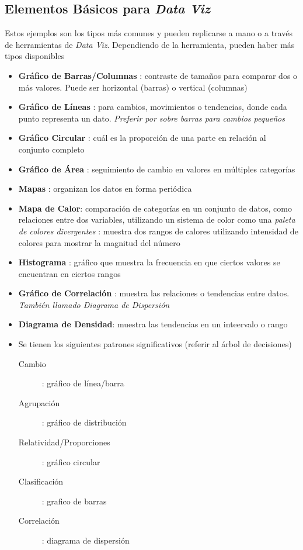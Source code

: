 \subsection{Elementos Básicos para \textit{Data Viz}}
Estos ejemplos son los tipos más comunes y pueden replicarse a mano o a través de herramientas de \textit{Data Viz}. Dependiendo de la herramienta, pueden haber más tipos disponibles
\begin{itemize}
    \item {\textbf{Gráfico de Barras/Columnas} : contraste de tamaños para comparar dos o más valores. Puede ser horizontal (barras) o vertical (columnas)}
    \item {\textbf{Gráfico de Líneas} : para cambios, movimientos o tendencias, donde cada punto representa un dato. \textit{Preferir por sobre barras para cambios pequeños}}
    \item {\textbf{Gráfico Circular} : cuál es la proporción de una parte en relación al conjunto completo}
    \item {\textbf{Gráfico de Área} : seguimiento de cambio en valores en múltiples categorías}
    \item {\textbf{Mapas} : organizan los datos en forma periódica}
    \item {\textbf{Mapa de Calor}: comparación de categorías en un conjunto de datos, como relaciones entre dos variables, utilizando un sistema de color como una \textit{paleta de colores divergentes} : muestra dos rangos de calores utilizando intensidad de colores para mostrar la magnitud del número}
    \item {\textbf{Histograma} : gráfico que muestra la frecuencia en que ciertos valores se encuentran en ciertos rangos}
    \item {\textbf{Gráfico de Correlación} : muestra las relaciones o tendencias entre datos. \textit{También llamado Diagrama de Dispersión}}
    \item {\textbf{Diagrama de Densidad}: muestra las tendencias en un inteervalo o rango}
    \item {Se tienen los siguientes patrones significativos (referir al árbol de decisiones)
    \begin{description}
        \item [Cambio]{ : gráfico de línea/barra}
        \item [Agrupación]{ : gráfico de distribución}
        \item [Relatividad/Proporciones]{ : gráfico circular}
        \item [Clasificación]{ : grafico de barras}
        \item [Correlación]{ : diagrama de dispersión}
    \end{description}}
\end{itemize}

